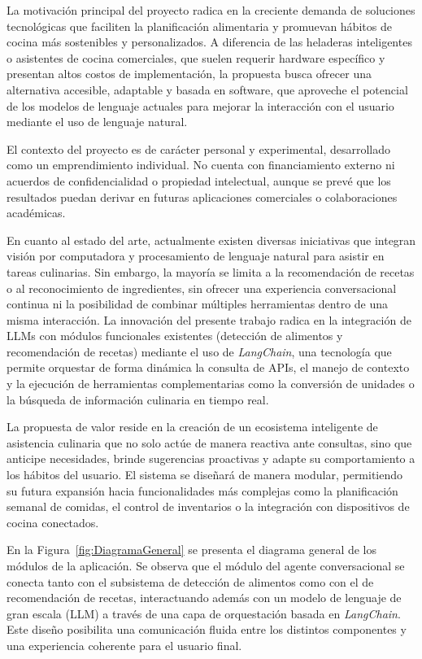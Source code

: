 \documentclass[
11pt, %
]{charter}
\begin{document}
La motivación principal del proyecto radica en la creciente demanda de soluciones tecnológicas que
 faciliten la planificación alimentaria y promuevan hábitos de cocina más sostenibles y personalizados. 
 A diferencia de las heladeras inteligentes o asistentes de cocina comerciales, que suelen requerir 
 hardware específico y presentan altos costos de implementación, la propuesta busca ofrecer una alternativa 
 accesible, adaptable y basada en software, que aproveche el potencial de los modelos de lenguaje 
 actuales para mejorar la interacción con el usuario mediante el uso de lenguaje natural.

El contexto del proyecto es de carácter personal y experimental, desarrollado como un emprendimiento 
individual. No cuenta con financiamiento externo ni acuerdos de confidencialidad o propiedad intelectual,
aunque se prevé que los resultados puedan derivar en futuras aplicaciones comerciales o colaboraciones
académicas.

En cuanto al estado del arte, actualmente existen diversas iniciativas que integran visión por
computadora y procesamiento de lenguaje natural para asistir en tareas culinarias. Sin embargo, 
la mayoría se limita a la recomendación de recetas o al reconocimiento de ingredientes, sin ofrecer 
una experiencia conversacional continua ni la posibilidad de combinar múltiples herramientas dentro 
de una misma interacción. La innovación del presente trabajo radica en la integración de LLMs con 
módulos funcionales existentes (detección de alimentos y recomendación de recetas) mediante el uso 
de \textit{LangChain}, una tecnología que permite orquestar de forma dinámica la consulta de APIs,
 el manejo de contexto y la ejecución de herramientas complementarias como la conversión de unidades
  o la búsqueda de información culinaria en tiempo real.

La propuesta de valor reside en la creación de un ecosistema inteligente de asistencia culinaria que 
no solo actúe de manera reactiva ante consultas, sino que anticipe necesidades, brinde sugerencias 
proactivas y adapte su comportamiento a los hábitos del usuario. El sistema se diseñará de manera 
modular, permitiendo su futura expansión hacia funcionalidades más complejas como la planificación 
semanal de comidas, el control de inventarios o la integración con dispositivos de cocina conectados.

En la Figura~\ref{fig:DiagramaGeneral} se presenta el diagrama general de los módulos de la aplicación. Se observa que el módulo del agente conversacional se conecta tanto con el subsistema de detección de alimentos como con el de recomendación de recetas, interactuando además con un modelo de lenguaje de gran escala (LLM) a través de una capa de orquestación basada en \textit{LangChain}. Este diseño posibilita una comunicación fluida entre los distintos componentes y una experiencia coherente para el usuario final.
\end{document}
